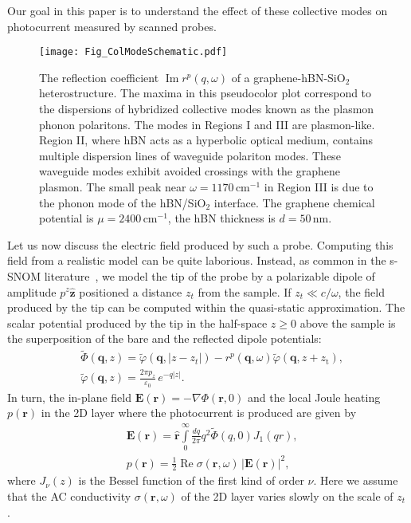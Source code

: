 \documentclass[aps, prb, reprint, superscriptaddress]{revtex4-2}
\DeclareMathOperator{\re}{Re}
\DeclareMathOperator{\im}{Im}
\renewcommand{\vec}{\mathbf}
\begin{document}
Our goal in this paper is to understand the effect of these collective modes on photocurrent measured by scanned probes.
\begin{figure}[th]
	\texttt{[image: Fig\_ColModeSchematic.pdf]}
	\caption{The reflection coefficient $\im r^p(q,\omega)$ of a  graphene-hBN-SiO$_2$ heterostructure. 
	The maxima in this pseudocolor plot correspond to the dispersions of hybridized collective modes known as the plasmon phonon polaritons. 
	The modes in Regions I and III are plasmon-like. 
	Region II, where hBN acts as a hyperbolic optical medium, contains multiple dispersion lines of waveguide polariton modes.
	These waveguide modes exhibit avoided crossings with the graphene plasmon. 
	The small peak near $\omega = 1170\, \mathrm{cm}^{-1}$ in Region III is due to the phonon mode of the hBN/SiO$_2$ interface.  
	The graphene chemical potential is $\mu = 2400\, \mathrm{cm}^{-1}$, the hBN thickness is $d = 50\, \mathrm{nm}$.}
	\label{fig:ColModes}
\end{figure} 
Let us now discuss the electric field produced by such a probe.
Computing this field from a realistic model can be quite laborious.
Instead, as common in the s-SNOM literature~\cite{Keilmann2004, Cvitkovic2007, Fei2011, Jiang2016},
we model the tip of the probe by a polarizable dipole of amplitude $p^z \hat{\vec{z}}$ positioned a distance $z_t$ from the sample.
If $z_t \ll c / \omega$,
the field produced by the tip can be computed within the
quasi-static approximation.
The scalar potential produced by the tip in the half-space $z \geq 0$ above the sample is the superposition of the bare and the reflected dipole potentials:
\begin{align}
	&\tilde{\Phi}(\vec{q}, z) = \tilde{\varphi}(\vec{q}, |z - z_t|) - r^p(\vec{q},\omega)\tilde{\varphi}(\vec{q}, z + z_\text{t}),
	\label{eqn:Phi_FS}\\
	& \tilde{\varphi}(\vec{q}, z) = \frac{2\pi p_z}{\varepsilon_0}\,
	 e^{-q |z|}.
	\label{eqn:V_FS}
\end{align}
In turn, the in-plane field $\vec{E}(\vec{r}) = -\nabla\Phi(\vec{r}, 0)$ 
and the local Joule heating $p(\vec{r})$ in the 2D layer where the photocurrent is produced are given by
\begin{align}
	&\vec{E}(\vec{r}) = \hat{\vec{r}} \int\limits_0^\infty \frac{dq}{2\pi}   q^2 \tilde{\Phi}(q, 0) J_1(q r),
\label{eqn:E_inplane}\\
	&p(\vec{r}) = \frac{1}{2} \re \sigma(\vec{r}, \omega)\, |\vec{E}(\vec{r})|^2,
\label{eqn:Joule_H}
\end{align}
where $J_\nu(z)$ is the Bessel function of the first kind of order $\nu$.
Here we assume that the AC conductivity $\sigma(\vec{r}, \omega)$
of the 2D layer varies slowly on the scale of $z_t$.
\end{document}
